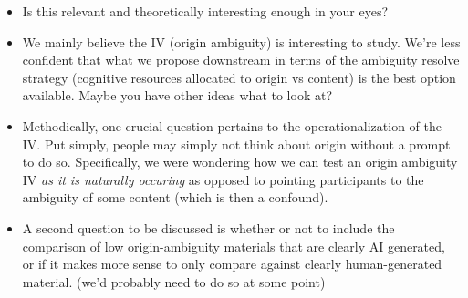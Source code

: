 \documentclass[
  letterpaper,
  DIV=11,
  numbers=noendperiod]{scrartcl}
\providecommand{\tightlist}{%
  \setlength{\itemsep}{0pt}\setlength{\parskip}{0pt}}
\begin{document}
\begin{itemize}
\tightlist
\item
  Is this relevant and theoretically interesting enough in your eyes?
\item
  We mainly believe the IV (origin ambiguity) is interesting to study.
  We're less confident that what we propose downstream in terms of the
  ambiguity resolve strategy (cognitive resources allocated to origin vs
  content) is the best option available. Maybe you have other ideas what
  to look at?
\item
  Methodically, one crucial question pertains to the operationalization
  of the IV. Put simply, people may simply not think about origin
  without a prompt to do so. Specifically, we were wondering how we can
  test an origin ambiguity IV \emph{as it is naturally occuring} as
  opposed to pointing participants to the ambiguity of some content
  (which is then a confound).
\item
  A second question to be discussed is whether or not to include the
  comparison of low origin-ambiguity materials that are clearly AI
  generated, or if it makes more sense to only compare against clearly
  human-generated material. (we'd probably need to do so at some point)
\end{itemize}
\end{document}
